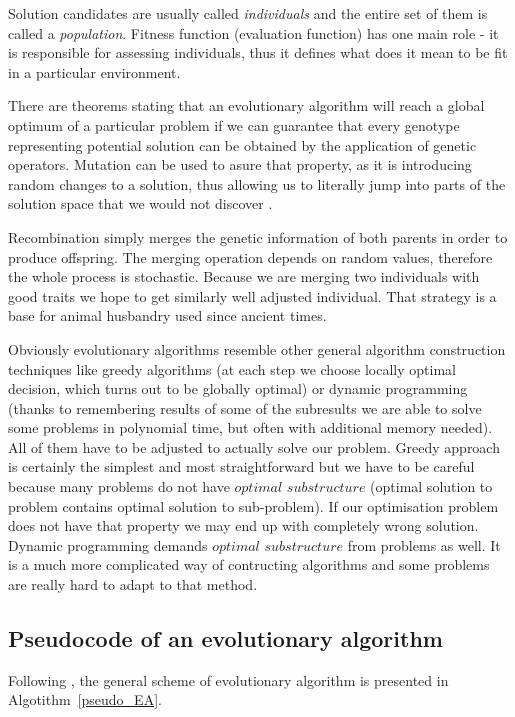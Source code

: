 Solution candidates are usually called \emph{individuals} and the entire set of them is called a \emph{population}. 
Fitness function (evaluation function) has one main role - it is responsible for assessing individuals, thus it defines what does it mean to be fit in a particular
environment.

There are theorems stating that an evolutionary algorithm will reach a global optimum of a particular problem if we can guarantee that every genotype representing
potential solution can be obtained by the application of genetic operators.
Mutation can be used to asure that property, as it is introducing random changes to a solution, thus allowing us to literally jump into parts of the solution space
that we would not discover \cite{evo}.       

Recombination simply merges the genetic information of both parents in order to produce offspring.
The merging operation depends on random values, therefore the whole process is stochastic.
Because we are merging two individuals with good traits we hope to get similarly well adjusted individual.
That strategy is a base for animal husbandry used since ancient times.
   
Obviously evolutionary algorithms resemble other general algorithm construction techniques like greedy algorithms (at each step we choose locally optimal decision, which 
turns out to be globally optimal) or dynamic programming (thanks to remembering results of some of the subresults we are able to solve some problems 
in polynomial time, but often with additional memory needed).
All of them have to be adjusted to actually solve our problem.
Greedy approach is certainly the simplest and most straightforward but we have to be careful because many problems do not have $optimal$ $substructure$ (optimal solution
to problem contains optimal solution to sub-problem).
If our optimisation problem does not have that property we may end up with completely wrong solution.
Dynamic programming demands $optimal$ $substructure$ from problems as well.
It is a much more complicated way of contructing algorithms and some problems are really hard to adapt to that method.
 

\subsection{Pseudocode of an evolutionary algorithm}

Following \cite{evo}, the general scheme of evolutionary algorithm is presented in Algotithm~\ref{pseudo_EA}.
 
